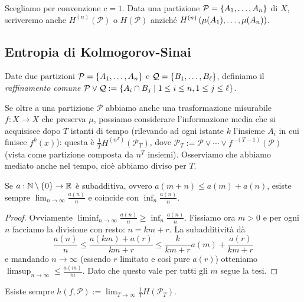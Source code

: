 Scegliamo per convenzione $c=1$.
Data una partizione $\mathcal{P}=\left\{A_1,\dots,A_n\right\}$ di $X$, scriveremo anche $H^{(n)}(\mathcal{P})$ o $H(\mathcal{P})$
anziché $H^{(n)}\left(\mu(A_1),\dots,\mu(A_n)\right)$.

\subsection{Entropia di Kolmogorov-Sinai}

\begin{defi}Date due partizioni $\mathcal{P}=\left\{A_1,\dots,A_n\right\}$ e $\mathcal{Q}=\left\{B_1,\dots,B_\ell\right\}$,
definiamo il \emph{raffinamento comune} $\mathcal{P}\vee\mathcal{Q}:=\left\{A_i\cap B_j\mid 1\le i\le n,1\le j\le \ell\right\}$.
\end{defi}

Se oltre a una partizione $\mathcal{P}$ abbiamo anche una trasformazione misurabile $f:X\to X$ che preserva $\mu$,
possiamo considerare l'informazione media che si acquisisce dopo $T$ istanti di tempo (rilevando
ad ogni istante $k$ l'insieme $A_i$ in cui finisce $f^k(x)$): questa è $\frac{1}{T}H^{(n^T)}(\mathcal{P}_T)$,
dove $\mathcal{P}_T:=\mathcal{P}\vee\cdots\vee f^{-(T-1)}(\mathcal{P})$ (vista come partizione composta
da $n^T$ insiemi). Osserviamo che abbiamo mediato anche nel tempo, cioè abbiamo diviso per $T$.

\begin{lemma}\label{fekete} Se $a:\mathbb{N}\setminus\left\{0\right\}\to\mathbb{R}$ è subadditiva, ovvero $a(m+n)\le a(m)+a(n)$, esiste sempre
$\lim_{n\to\infty}\frac{a(n)}{n}$ e coincide con $\inf_n\frac{a(n)}{n}$.
\end{lemma}

\begin{proof}Ovviamente $\liminf_{n\to\infty}\frac{a(n)}{n}\ge\inf_n\frac{a(n)}{n}$. Fissiamo ora $m>0$
e per ogni $n$ facciamo la divisione con resto: $n=km+r$. La subadditività dà
\[ \frac{a(n)}{n}\le\frac{a(km)+a(r)}{km+r}\le\frac{k}{km+r}a(m)+\frac{a(r)}{km+r} \]
e mandando $n\to\infty$ (essendo $r$ limitato e così pure $a(r)$) otteniamo $\limsup_{n\to\infty}\le\frac{a(m)}{m}$.
Dato che questo vale per tutti gli $m$ segue la tesi.
\end{proof}

\begin{cor}Esiste sempre $h(f,\mathcal{P}):=\lim_{T\to\infty}\frac{1}{T}H(\mathcal{P}_T)$.
\end{cor}

